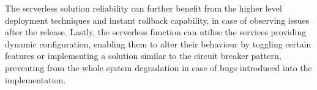 The serverless solution reliability can further benefit from the higher level deployment techniques and instant rollback capability, in case of observing issues after the release. Lastly, the serverless function can utilise the services providing dynamic configuration, enabling them to alter their behaviour by toggling certain features or implementing a solution similar to the circuit breaker pattern, preventing from the whole system degradation in case of bugs introduced into the implementation.






